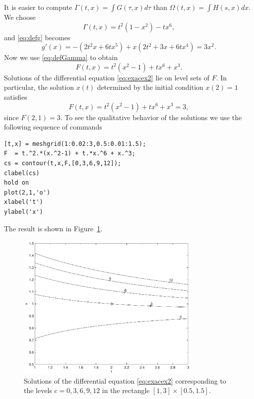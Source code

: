 \documentclass{ximera}
\begin{document}
It is easier to compute $\Gamma(t,x)=\int G(\tau,x) d\tau$ than 
$\Omega(t,x)=\int H(s,x)dx$.  We choose 
\[
\Gamma(t,x) = t^2(1-x^2) - tx^6,
\]
and \eqref{eq:defg} becomes
\[
g'(x) = -(2t^2 x + 6tx^5) + x(2t^2+3x+6tx^4) = 3x^2.
\]
Now we use \eqref{eq:defGamma} to obtain
\[
F(t,x) = t^2(x^2-1) + tx^6 + x^3.
\]
Solutions of the differential equation \eqref{eq:exacex2} lie on
level sets of $F$.  In particular, the solution $x(t)$
determined by the initial condition $x(2)=1$ satisfies 
\[
F(t,x)=t^2(x^2-1) + tx^6 + x^3 = 3,
\]
since $F(2,1)=3$.  To see the qualitative behavior of the
solutions we use the following sequence 
of \Matlab commands
\begin{verbatim}
[t,x] = meshgrid(1:0.02:3,0.5:0.01:1.5);
F  = t.^2.*(x.^2-1) + t.*x.^6 + x.^3;
cs = contour(t,x,F,[0,3,6,9,12]);
clabel(cs)
hold on
plot(2,1,'o')                  
xlabel('t')
ylabel('x')
\end{verbatim}
The result is shown in Figure~\ref{Fig:contour3}.  

\begin{figure}[htb]
  \centerline{%
  \includegraphics[width=3.5in]{../figures/contour3.pdf}}
  \caption{Solutions of the differential equation
\protect\eqref{eq:exacex2}
  corresponding to the levels $c=0,3,6,9,12$ in the rectangle
  $[1,3]\times [0.5,1.5]$.}
\label{Fig:contour3}
\end{figure}




\end{document}
